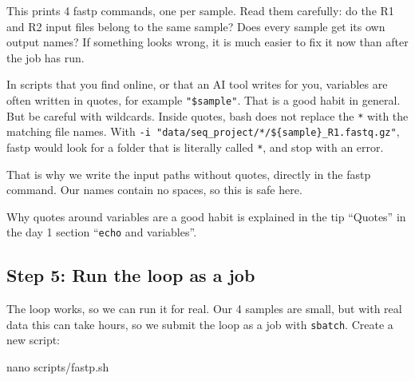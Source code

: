 \documentclass[
  letterpaper,
  DIV=11,
  numbers=noendperiod]{scrreprt}
\newenvironment{Shaded}{}{}
\newcommand{\FunctionTok}[1]{\textcolor[rgb]{0.44,0.26,0.76}{#1}}
\newcommand{\NormalTok}[1]{\textcolor[rgb]{0.14,0.16,0.18}{#1}}
\begin{document}
This prints 4 fastp commands, one per sample. Read them carefully: do
the R1 and R2 input files belong to the same sample? Does every sample
get its own output names? If something looks wrong, it is much easier to
fix it now than after the job has run.

\begin{tcolorbox}[enhanced jigsaw, colbacktitle=quarto-callout-important-color!10!white, rightrule=.15mm, leftrule=.75mm, colback=white, opacitybacktitle=0.6, title=\textcolor{quarto-callout-important-color}{\faExclamation}\hspace{0.5em}{Important: Don't put quotes around a path with a wildcard}, bottomrule=.15mm, left=2mm, colframe=quarto-callout-important-color-frame, opacityback=0, breakable, bottomtitle=1mm, coltitle=black, arc=.35mm, toprule=.15mm, toptitle=1mm, titlerule=0mm]

In scripts that you find online, or that an AI tool writes for you,
variables are often written in quotes, for example \texttt{"\$sample"}.
That is a good habit in general. But be careful with wildcards. Inside
quotes, bash does not replace the \texttt{*} with the matching file
names. With
\texttt{-i\ "data/seq\_project/*/\$\{sample\}\_R1.fastq.gz"}, fastp
would look for a folder that is literally called \texttt{*}, and stop
with an error.

That is why we write the input paths without quotes, directly in the
fastp command. Our names contain no spaces, so this is safe here.

Why quotes around variables are a good habit is explained in the tip
``Quotes'' in the day 1 section ``\texttt{echo} and variables''.

\end{tcolorbox}

\subsection{Step 5: Run the loop as a
job}\label{step-5-run-the-loop-as-a-job}

The loop works, so we can run it for real. Our 4 samples are small, but
with real data this can take hours, so we submit the loop as a job with
\texttt{sbatch}. Create a new script:

\begin{Shaded}
\begin{Highlighting}[]
\FunctionTok{nano}\NormalTok{ scripts/fastp.sh}
\end{Highlighting}
\end{Shaded}
\end{document}
